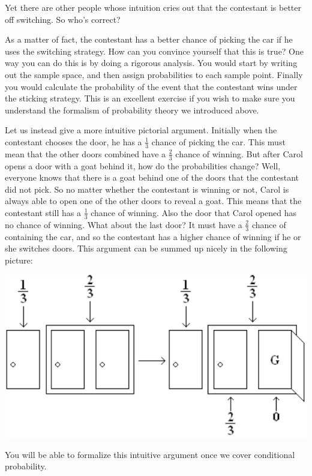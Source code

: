 \documentclass[11pt,fleqn]{article}
\begin{document}
Yet there are other people whose intuition cries out that the contestant 
is better off switching. So who's correct? 

As a matter of fact, the contestant has a better chance of picking the car if he uses
the switching strategy. How can you convince yourself that this is true? 
One way you can do this is by doing a rigorous analysis. You would 
start by writing out the sample space, and then assign probabilities to 
each sample point. Finally you would calculate the probability of the 
event that the contestant wins under the sticking strategy. This is an 
excellent exercise if you wish to make sure you understand the formalism 
of probability theory we introduced above. 

Let us instead give a more intuitive pictorial argument. Initially when the 
contestant chooses the door, he has a $\frac{1}{3}$ chance of picking the car.
This must mean that the other
doors combined have a $\frac{2}{3}$ chance of winning. But after Carol opens
a door with a goat behind it, how do the probabilities change? Well,
everyone knows that there is a goat behind one of the doors that the
contestant did not pick. So no matter whether the contestant is winning or 
not, Carol is always able to open one of the other doors to reveal a goat. 
This means that the contestant still has a $\frac{1}{3}$ chance of winning. 
Also the door that Carol opened has no chance of winning. What about the last door? It must
have a $\frac{2}{3}$ chance of containing the car, and so the contestant has a higher
chance of winning if he or she switches doors. This argument can be summed up nicely
in the following picture:

\includegraphics[bb = -40 0 0 190, scale=0.7]{monty}

You will be able to formalize this intuitive argument once we cover conditional probability. 
\end{document}
